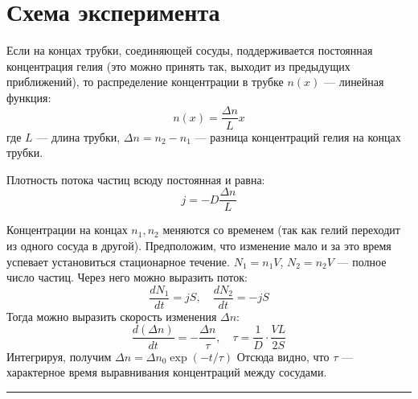 \documentclass[a4paper,12pt]{report}
\begin{document}
    \section{Схема эксперимента}
    \begin{multicols}{2}
        Если на концах трубки, соединяющей сосуды, поддерживается постоянная концентрация гелия (это можно принять так, выходит из предыдущих приближений), то распределение концентрации в трубке $n(x)$ --- линейная функция:
        \begin{equation}
            n(x)=\frac{\Delta n}{L}x
        \end{equation}
        где $L$ --- длина трубки, $\Delta n = n_2-n_1$ --- разница концентраций гелия на концах трубки.

        Плотность потока частиц всюду постоянная и равна:
        \begin{equation}
            j=-D\frac{\Delta n}{L}
        \end{equation}

        Концентрации на концах $n_1,n_2$ меняются со временем (так как гелий переходит из одного сосуда в другой). Предположим, что изменение мало и за это время успевает установиться стационарное течение. $N_1=n_1V$, $N_2=n_2V$ --- полное число частиц. Через него можно выразить поток:
        \begin{equation}
            \frac{dN_1}{dt}=jS, \quad \frac{dN_2}{dt}=-jS
        \end{equation}
        Тогда можно выразить скорость изменения $\Delta n$:
        \begin{equation}
            \frac{d(\Delta n)}{dt}=-\frac{\Delta n}{\tau}, \quad \tau=\frac{1}{D}\cdot\frac{VL}{2S} \label{tau}
        \end{equation}
        Интегрируя, получим $\Delta n = \Delta n_0 \exp{(-t/\tau)}$
        Отсюда видно, что $\tau$ --- характерное время выравнивания концентраций между сосудами.
    \end{multicols}
    \vspace{1cm}
    \hrule
\end{document}
